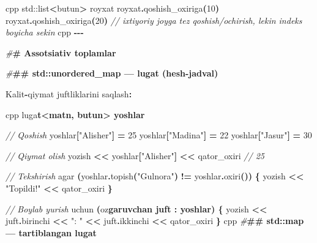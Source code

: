 \documentclass[a4paper,11pt,twoside,openright]{book}
\newenvironment{Shaded}{\begin{snugshade}}{\end{snugshade}}
\newcommand{\BuiltInTok}[1]{#1}
\newcommand{\CharTok}[1]{\textcolor[rgb]{0.31,0.60,0.02}{#1}}
\newcommand{\CommentTok}[1]{\textcolor[rgb]{0.56,0.35,0.01}{\textit{#1}}}
\newcommand{\DecValTok}[1]{\textcolor[rgb]{0.00,0.00,0.81}{#1}}
\newcommand{\ErrorTok}[1]{\textcolor[rgb]{0.64,0.00,0.00}{\textbf{#1}}}
\newcommand{\NormalTok}[1]{#1}
\newcommand{\OperatorTok}[1]{\textcolor[rgb]{0.81,0.36,0.00}{\textbf{#1}}}
\newcommand{\PreprocessorTok}[1]{\textcolor[rgb]{0.56,0.35,0.01}{\textit{#1}}}
\newcommand{\StringTok}[1]{\textcolor[rgb]{0.31,0.60,0.02}{#1}}
\begin{document}
\begin{Shaded}
\begin{Highlighting}[]
\ErrorTok{\textasciigrave{}\textasciigrave{}\textasciigrave{}}\NormalTok{cpp}
\BuiltInTok{std::}\NormalTok{list}\OperatorTok{\textless{}}\NormalTok{butun}\OperatorTok{\textgreater{}}\NormalTok{ royxat}
\NormalTok{royxat}\OperatorTok{.}\NormalTok{qoshish\_oxiriga}\OperatorTok{(}\DecValTok{10}\OperatorTok{)}
\NormalTok{royxat}\OperatorTok{.}\NormalTok{qoshish\_oxiriga}\OperatorTok{(}\DecValTok{20}\OperatorTok{)}
\CommentTok{// ixtiyoriy joyga tez qo\textquotesingle{}shish/o\textquotesingle{}chirish, lekin indeks bo\textquotesingle{}yicha sekin}
\ErrorTok{\textasciigrave{}\textasciigrave{}\textasciigrave{}}\NormalTok{cpp}
\OperatorTok{{-}{-}{-}}

\PreprocessorTok{\#}\ErrorTok{\# Assotsiativ to\textquotesingle{}plamlar}

\PreprocessorTok{\#}\ErrorTok{\#\# \textasciigrave{}std::unordered\_map\textasciigrave{} — lug\textquotesingle{}at (hesh{-}jadval)}

\NormalTok{Kalit}\OperatorTok{{-}}\NormalTok{qiymat juftliklarini saqlash}\OperatorTok{:}

\ErrorTok{\textasciigrave{}\textasciigrave{}\textasciigrave{}}\NormalTok{cpp}
\NormalTok{lug}\CharTok{\textquotesingle{}a}\ErrorTok{t\textless{}matn, butun\textgreater{} yoshlar}

\CommentTok{// Qo\textquotesingle{}shish}
\NormalTok{yoshlar}\OperatorTok{[}\StringTok{"Alisher"}\OperatorTok{]} \OperatorTok{=} \DecValTok{25}
\NormalTok{yoshlar}\OperatorTok{[}\StringTok{"Madina"}\OperatorTok{]} \OperatorTok{=} \DecValTok{22}
\NormalTok{yoshlar}\OperatorTok{[}\StringTok{"Jasur"}\OperatorTok{]} \OperatorTok{=} \DecValTok{30}

\CommentTok{// Qiymat olish}
\NormalTok{yozish }\OperatorTok{\textless{}\textless{}}\NormalTok{ yoshlar}\OperatorTok{[}\StringTok{"Alisher"}\OperatorTok{]} \OperatorTok{\textless{}\textless{}}\NormalTok{ qator\_oxiri   }\CommentTok{// 25}

\CommentTok{// Tekshirish}
\NormalTok{agar }\OperatorTok{(}\NormalTok{yoshlar}\OperatorTok{.}\NormalTok{topish}\OperatorTok{(}\StringTok{"Gulnora"}\OperatorTok{)} \OperatorTok{!=}\NormalTok{ yoshlar}\OperatorTok{.}\NormalTok{oxiri}\OperatorTok{())} \OperatorTok{\{}
\NormalTok{    yozish }\OperatorTok{\textless{}\textless{}} \StringTok{"Topildi!"} \OperatorTok{\textless{}\textless{}}\NormalTok{ qator\_oxiri}
\OperatorTok{\}}

\CommentTok{// Bo\textquotesingle{}ylab yurish}
\NormalTok{uchun }\OperatorTok{(}\NormalTok{o}\CharTok{\textquotesingle{}z}\ErrorTok{garuvchan juft : yoshlar) \{}
\NormalTok{    yozish }\OperatorTok{\textless{}\textless{}}\NormalTok{ juft}\OperatorTok{.}\NormalTok{birinchi }\OperatorTok{\textless{}\textless{}} \StringTok{": "} \OperatorTok{\textless{}\textless{}}\NormalTok{ juft}\OperatorTok{.}\NormalTok{ikkinchi }\OperatorTok{\textless{}\textless{}}\NormalTok{ qator\_oxiri}
\OperatorTok{\}}
\ErrorTok{\textasciigrave{}\textasciigrave{}\textasciigrave{}}\NormalTok{cpp}
\PreprocessorTok{\#}\ErrorTok{\#\# \textasciigrave{}std::map\textasciigrave{} — tartiblangan lug\textquotesingle{}at}


\end{Highlighting}
\end{Shaded}
\end{document}
